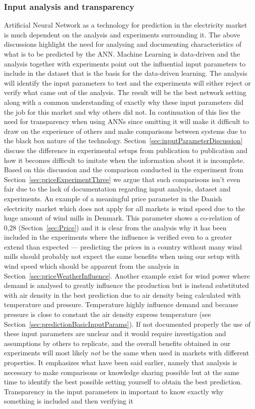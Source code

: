 \subsubsection{Input analysis and transparency}
Artificial Neural Network as a technology for prediction in the electricity market is much dependent on the analysis and experiments surrounding it. The above discussions highlight the need for analysing and documenting characteristics of what is to be predicted by the ANN. Machine Learning is data-driven\cite{18} and the analysis together with experiments point out the influential input parameters to include in the dataset that is the basis for the data-driven learning. The analysis will identify the input parameters to test and the experiments will either reject or verify what came out of the analysis. The result will be the best network setting along with a common understanding of exactly why these input parameters did the job for this market and why others did not. In continuation of this lies the need for transparency when using ANNs since omitting it will make it difficult to draw on the experience of others and make comparisons between systems due to the black box nature of the technology. Section~\ref{sec:inputParameterDiscussion} discuss the difference in experimental setups from publication to publication and how it becomes difficult to imitate when the information about it is incomplete. Based on this discussion and the comparison conducted in the experiment from Section~\ref{sec:priceExperimentThree} we argue that such comparisons isn't even fair due to the lack of documentation regarding input analysis, dataset and experiments. An example of a meaningful price parameter in the Danish electricity market which does not apply for all markets is wind speed due to the huge amount of wind mills in Denmark. This parameter shows a co-relation of 0,28 (Section~\ref{sec:Price}) and it is clear from the analysis why it has been included in the experiments where the influence is verified even to a greater extend than expected --- predicting the prices in a country without many wind mills should probably not expect the same benefits when using our setup with wind speed which should be apparent from the analysis in Section~\ref{sec:priceWeatherInfluence}. Another example exist for wind power where demand is analysed to greatly influence the production but is instead substituted with air density in the best prediction due to air density being calculated with temperature and pressure. Temperature highly influence demand and because pressure is close to constant the air density express temperature (see Section~\ref{sec:predictionBasicInputParams}). If not documented properly the use of these input parameters are unclear and it would require investigation and assumptions by others to replicate, and the overall benefits obtained in our experiments will most likely \emph{not} be the same when used in markets with different properties. It emphasizes what have been said earlier, namely that analysis is necessary to make comparisons or knowledge sharing possible but at the same time to identify the best possible setting yourself to obtain the best prediction. Transparency in the input parameters in important to know exactly why something is included and then verifying it 